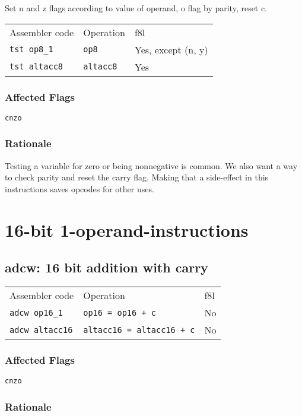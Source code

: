 \documentclass{book}
\begin{document}
Set n and z flags according to value of operand, o flag by parity, reset c.

\begin{tabular}{l l l}
Assembler code       & Operation        & f8l \\
\texttt{tst op8\_1}  & \texttt{op8}     & Yes, except (n, y) \\
\texttt{tst altacc8} & \texttt{altacc8} & Yes
\end{tabular}

\subsubsection*{Affected Flags}

\texttt{cnzo}

\subsubsection*{Rationale}

Testing a variable for zero or being nonnegative is common. We also want a way to check parity and reset the carry flag. Making that a side-effect in this instructions saves opcodes for other uses.


\section{16-bit 1-operand-instructions}

\subsection{adcw: 16 bit addition with carry}

\begin{tabular}{l l l}
Assembler code         & Operation                        & f8l \\
\texttt{adcw op16\_1}  & \texttt{op16 = op16 + c}         & No \\
\texttt{adcw altacc16} & \texttt{altacc16 = altacc16 + c} & No
\end{tabular}

\subsubsection*{Affected Flags}

\texttt{cnzo}

\subsubsection*{Rationale}
\end{document}
